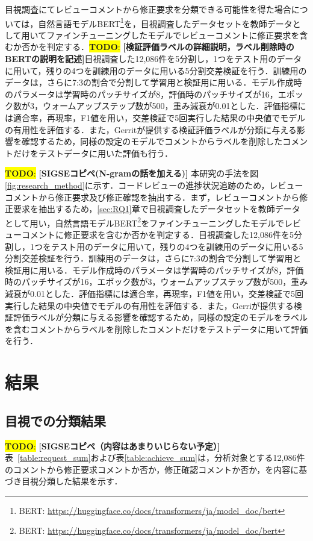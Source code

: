 \documentclass[11pt]{jreport}
\newcommand{\todo}[1]{\colorbox{yellow}{{\bf TODO}:}{\color{red} {\textbf{[#1]}}}}
\begin{document}
目視調査にてレビューコメントから修正要求を分類できる可能性を得た場合については，自然言語モデルBERT\footnote{BERT: \url{https://huggingface.co/docs/transformers/ja/model_doc/bert}}を，目視調査したデータセットを教師データとして用いてファインチューニングしたモデルでレビューコメントに修正要求を含むか否かを判定する．\todo{検証評価ラベルの詳細説明，ラベル削除時のBERTの説明を記述}目視調査した12,086件を5分割し，1つをテスト用のデータに用いて，残りの4つを訓練用のデータに用いる5分割交差検証を行う．訓練用のデータは，さらに7:3の割合で分割して学習用と検証用に用いる．モデル作成時のパラメータは学習時のパッチサイズが8，評価時のパッチサイズが16，エポック数が3，ウォームアップステップ数が500，重み減衰が0.01とした．評価指標には適合率，再現率，F1値を用い，交差検証で5回実行した結果の中央値でモデルの有用性を評価する．また，Gerritが提供する検証評価ラベルが分類に与える影響を確認するため，同様の設定のモデルでコメントからラベルを削除したコメントだけをテストデータに用いた評価も行う．

\todo{SIGSEコピペ(N-gramの話を加える)}
本研究の手法を図\ref{fig:research_method}に示す．コードレビューの進捗状況追跡のため，レビューコメントから修正要求及び修正確認を抽出する．まず，レビューコメントから修正要求を抽出するため，\ref{sec:RQ1}章で目視調査したデータセットを教師データとして用い，自然言語モデルBERT\footnote{BERT: \url{https://huggingface.co/docs/transformers/ja/model_doc/bert}}をファインチューニングしたモデルでレビューコメントに修正要求を含むか否かを判定する．目視調査した12,086件を5分割し，1つをテスト用のデータに用いて，残りの4つを訓練用のデータに用いる5分割交差検証を行う．訓練用のデータは，さらに7:3の割合で分割して学習用と検証用に用いる．モデル作成時のパラメータは学習時のパッチサイズが8，評価時のパッチサイズが16，エポック数が3，ウォームアップステップ数が500，重み減衰が0.01とした．評価指標には適合率，再現率，F1値を用い，交差検証で5回実行した結果の中央値でモデルの有用性を評価する．また，Gerriが提供する検証評価ラベルが分類に与える影響を確認するため，同様の設定のモデルをラベルを含むコメントからラベルを削除したコメントだけをテストデータに用いて評価を行う．

\section{結果}
\subsection{目視での分類結果}

\todo{SIGSEコピペ（内容はあまりいじらない予定）}
表~\ref{table:request_sum}および表\ref{table:achieve_sum}は，分析対象とする12,086件のコメントから修正要求コメントか否か，修正確認コメントか否か，を内容に基づき目視分類した結果を示す．
\end{document}
